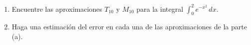 \item 
    \begin{enumerate}
        \item[(a)] Encuentre las aproximaciones $T_{10}$ y $M_{10}$ para la integral $\int_{0}^{2} e^{-x^2} \, dx$.
        \item[(b)] Haga una estimación del error en cada una de las aproximaciones de la parte (a).
    \end{enumerate}
